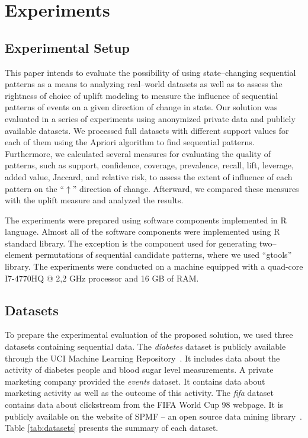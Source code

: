 \documentclass[runningheads,a4paper]{llncs}
\begin{document}
\section{Experiments}
\label{sec:experiments}
\subsection{Experimental Setup}
This paper intends to evaluate the possibility of using state--changing sequential patterns as a means to analyzing real--world datasets as well as to assess the rightness of choice of uplift modeling to measure the influence of sequential patterns of events on a given direction of change in state.
Our solution was evaluated in a series of experiments using anonymized private data and publicly available datasets.
We processed full datasets with different support values for each of them using the Apriori algorithm to find sequential patterns.
Furthermore, we calculated several measures for evaluating the quality of patterns, such as support, confidence, coverage, prevalence, recall, lift, leverage, added value, Jaccard, and relative risk, to assess the extent of influence of each pattern on the ``$\uparrow$'' direction of change.
Afterward, we compared these measures with the uplift measure and analyzed the results. 

The experiments were prepared using software components implemented in R language.
Almost all of the software components were implemented using R standard library.
The exception is the component used for generating two--element permutations of sequential candidate patterns, where we used ``gtools'' library.
The experiments were conducted on a machine equipped with a quad-core I7-4770HQ @ 2,2 GHz processor and 16 GB of RAM.

\subsection{Datasets}
To prepare the experimental evaluation of the proposed solution, we used three datasets containing sequential data.
The \textit{diabetes} dataset is publicly available through the UCI Machine Learning Repository~\cite{Kahn:1994}.
It includes data about the activity of diabetes people and blood sugar level measurements.
A private marketing company provided the \textit{events} dataset.
It contains data about marketing activity as well as the outcome of this activity.
The \textit{fifa} dataset contains data about clickstream from the FIFA World Cup 98 webpage.
It is publicly available on the website of SPMF – an open source data mining library~\cite{Fournier}.
Table \ref{tab:datasets} presents the summary of each dataset.
\end{document}
